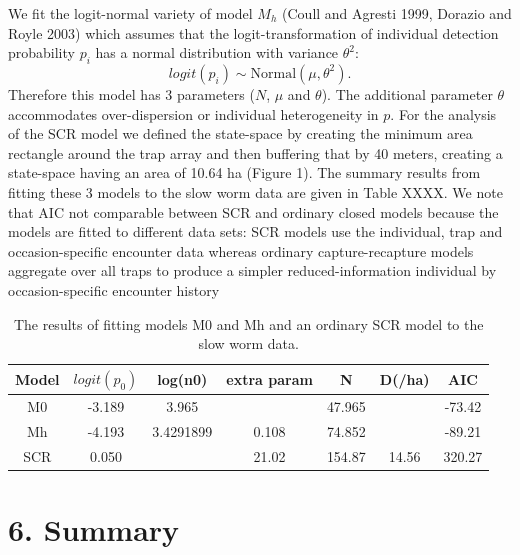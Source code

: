 \documentclass{book}
\begin{document}
We fit the logit-normal variety of model $M_h$ (Coull and Agresti
1999, Dorazio and Royle 2003) which assumes that the
logit-transformation of individual detection probability $p_i$ has a
normal distribution with variance $\theta^2$:
\[
 logit(p_i) \sim \mbox{Normal}(\mu, \theta^2).
\]
Therefore this model has 3 parameters ($N$, $\mu$ and $\theta$).  The
additional parameter $\theta$ accommodates over-dispersion or
individual heterogeneity in $p$.
For the analysis of the SCR model we defined
 the state-space by creating the minimum area rectangle around the trap array
and then buffering that by 40 meters, creating a state-space having an
area of 10.64 ha (Figure 1).
The summary results from fitting these 3 models to the slow worm data
are given in Table XXXX. We note that
AIC not comparable between SCR and ordinary closed models because the
models are fitted to different data sets:
SCR models use the individual, trap and occasion-specific
encounter data whereas ordinary capture-recapture models aggregate
over all traps to produce a simpler reduced-information individual by
occasion-specific encounter history

\begin{table}[ht]
\centering
\caption{The results of fitting models M0 and Mh and an ordinary SCR
  model to the slow worm data. }
\begin{tabular}{ccccccc}
Model & $logit(p_0)$ & log(n0)   & extra param & N      & D(/ha)  & AIC     \\ \hline
M0    & -3.189       & 3.965     &             & 47.965 &         & -73.42  \\
Mh    & -4.193       & 3.4291899 & 0.108       & 74.852 &         & -89.21  \\
SCR   &  0.050       &           & 21.02       & 154.87 & 14.56   & 320.27  \\
\end{tabular}
\end{table}

\section*{6. Summary}
\end{document}
